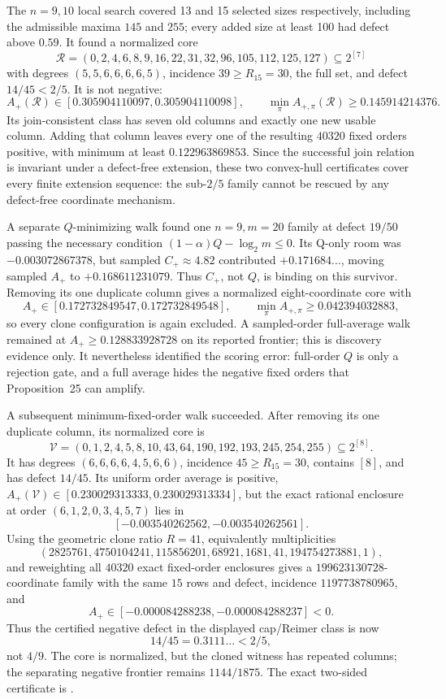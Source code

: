 \documentclass[11pt]{article}
\theoremstyle{remark}
\begin{document}
The $n=9,10$ local search covered 13 and 15 selected sizes respectively,
including the admissible maxima $145$ and $255$; every added size at least 100
had defect above $0.59$.  It found a normalized core
\[
 \mathcal R=(0,2,4,6,8,9,16,22,31,32,96,105,112,125,127)
 \subseteq2^{[7]}
\]
with degrees $(5,5,6,6,6,6,5)$, incidence $39\ge R_{15}=30$, the full set,
and defect $14/45<2/5$.  It is not negative:
\[
 A_+(\mathcal R)\in[0.305904110097,0.305904110098],
 \qquad \min_\pi A_{+,\pi}(\mathcal R)\ge0.145914214376 .
\]
Its join-consistent class has seven old columns and exactly one new usable
column.  Adding that column leaves every one of the resulting $40320$ fixed
orders positive, with minimum at least $0.122963869853$.  Since the successful
join relation is invariant under a defect-free extension, these two convex-hull
certificates cover every finite extension sequence: the sub-$2/5$ family cannot
be rescued by any defect-free coordinate mechanism.

A separate $Q$-minimizing walk found one $n=9,m=20$ family at defect $19/50$
passing the necessary condition $(1-\alpha)Q-\log_2m\le0$. Its Q-only room was
$-0.003072867378$, but sampled $C_+\approx4.82$ contributed
$+0.171684\ldots$, moving sampled $A_+$ to $+0.168611231079$.
Thus $C_+$, not $Q$, is binding on this survivor. Removing its one duplicate
column gives a normalized eight-coordinate core with
\[
 A_+\in[0.172732849547,0.172732849548],\qquad
 \min_\pi A_{+,\pi}\ge0.042394032883,
\]
so every clone configuration is again excluded. A sampled-order full-average
walk remained at $A_+\ge0.128833928728$ on its reported frontier; this is
discovery evidence only.  It nevertheless identified the scoring error:
full-order $Q$ is only a rejection gate, and a full average hides the negative
fixed orders that Proposition~25 can amplify.

A subsequent minimum-fixed-order walk succeeded.  After removing its one
duplicate column, its normalized core is
\[
 \mathcal V=(0,1,2,4,5,8,10,43,64,190,192,193,245,254,255)
 \subseteq2^{[8]}.
\]
It has degrees $(6,6,6,6,4,5,6,6)$, incidence $45\ge R_{15}=30$, contains
$[8]$, and has defect $14/45$.  Its uniform order average is positive,
$A_+(\mathcal V)\in[0.230029313333,0.230029313334]$, but the exact rational
enclosure at order $(6,1,2,0,3,4,5,7)$ lies in
\[
 [-0.003540262562,-0.003540262561].
\]
Using the geometric clone ratio $R=41$, equivalently multiplicities
\[
 (2825761,4750104241,115856201,68921,1681,41,194754273881,1),
\]
and reweighting all $40320$ exact fixed-order enclosures gives a
$199623130728$-coordinate family with the same $15$ rows and defect, incidence
$1197738780965$, and
\[
 A_+\in[-0.000084288238,-0.000084288237]<0.
\]
Thus the certified negative defect in the displayed cap/Reimer class is now
\[
 \boxed{14/45=0.3111\ldots<2/5},
\]
not $4/9$.  The core is normalized, but the cloned witness has repeated
columns; the separating negative frontier remains $1144/1875$.  The exact
two-sided certificate is
.
\end{document}
